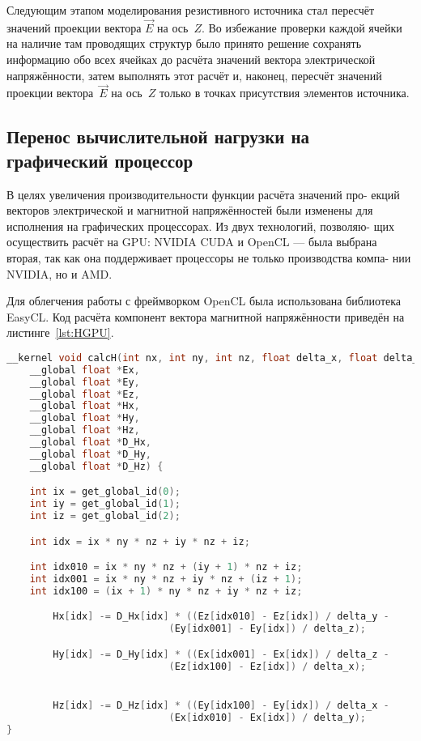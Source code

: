 Следующим этапом моделирования резистивного источника стал пересчёт
значений проекции вектора $ \vec{E} $ на ось~$ Z $. Во избежание проверки каждой ячейки на наличие там проводящих структур было принято решение сохранять информацию обо всех ячейках до расчёта значений вектора электрической напряжённости, затем выполнять этот расчёт и, наконец, пересчёт значений проекции
вектора~$ \vec{E} $ на ось~$ Z $ только в точках присутствия элементов источника.

\subsection{Перенос вычислительной нагрузки на графический процессор}

В целях увеличения производительности функции расчёта значений про-
екций векторов электрической и магнитной напряжённостей были изменены
для исполнения на графических процессорах. Из двух технологий, позволяю-
щих осуществить расчёт на GPU: NVIDIA CUDA и OpenCL --- была выбрана
вторая, так как она поддерживает процессоры не только производства компа-
нии NVIDIA, но и AMD.

Для облегчения работы с фреймворком OpenCL была использована библиотека EasyCL. Код расчёта компонент вектора магнитной напряжённости
приведён на листинге~\ref{lst:HGPU}.

\begin{lstlisting}[caption={Код расчёта компонент вектора магнитной напряжённости на ГПУ},label={lst:HGPU},language=C++, float, floatplacement=p]
__kernel void calcH(int nx, int ny, int nz, float delta_x, float delta_y, float delta_z,
    __global float *Ex,
    __global float *Ey,
    __global float *Ez,
    __global float *Hx,
    __global float *Hy,
    __global float *Hz,
    __global float *D_Hx,
    __global float *D_Hy,
    __global float *D_Hz) {

    int ix = get_global_id(0);
    int iy = get_global_id(1);
    int iz = get_global_id(2);

    int idx = ix * ny * nz + iy * nz + iz;

    int idx010 = ix * ny * nz + (iy + 1) * nz + iz;
    int idx001 = ix * ny * nz + iy * nz + (iz + 1);
    int idx100 = (ix + 1) * ny * nz + iy * nz + iz;

        Hx[idx] -= D_Hx[idx] * ((Ez[idx010] - Ez[idx]) / delta_y -
                            (Ey[idx001] - Ey[idx]) / delta_z);

        Hy[idx] -= D_Hy[idx] * ((Ex[idx001] - Ex[idx]) / delta_z -
                            (Ez[idx100] - Ez[idx]) / delta_x);


        Hz[idx] -= D_Hz[idx] * ((Ey[idx100] - Ey[idx]) / delta_x -
                            (Ex[idx010] - Ex[idx]) / delta_y);
}
\end{lstlisting}
\clearpage